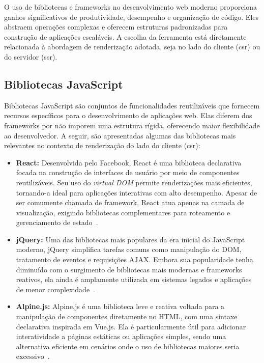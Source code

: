 O uso de bibliotecas e frameworks no desenvolvimento web moderno proporciona ganhos significativos de produtividade, desempenho e organização de código. Eles abstraem operações complexas e oferecem estruturas padronizadas para construção de aplicações escaláveis. A escolha da ferramenta está diretamente relacionada à abordagem de renderização adotada, seja no lado do cliente (\acrshort{csr}) ou do servidor (\acrshort{ssr}).

\subsection{Bibliotecas JavaScript}
\label{subsec:bibliotecas-js}

Bibliotecas JavaScript são conjuntos de funcionalidades reutilizáveis que fornecem recursos específicos para o desenvolvimento de aplicações web. Elas diferem dos frameworks por não imporem uma estrutura rígida, oferecendo maior flexibilidade ao desenvolvedor. A seguir, são apresentadas algumas das bibliotecas mais relevantes no contexto de renderização do lado do cliente (\acrshort{csr}):


\begin{itemize}
  \item \textbf{React:} Desenvolvida pelo Facebook, React é uma biblioteca declarativa focada na construção de interfaces de usuário por meio de componentes reutilizáveis. Seu uso do \textit{virtual DOM} permite renderizações mais eficientes, tornando-a ideal para aplicações interativas com alto desempenho. Apesar de ser comumente chamada de framework, React atua apenas na camada de visualização, exigindo bibliotecas complementares para roteamento e gerenciamento de estado~\cite{react2025}.

  \item \textbf{jQuery:} Uma das bibliotecas mais populares da era inicial do JavaScript moderno, jQuery simplifica tarefas comuns como manipulação do DOM, tratamento de eventos e requisições AJAX. Embora sua popularidade tenha diminuído com o surgimento de bibliotecas mais modernas e frameworks reativos, ela ainda é amplamente utilizada em sistemas legados e aplicações de menor complexidade~\cite{jquery2023}.

  \item \textbf{Alpine.js:} Alpine.js é uma biblioteca leve e reativa voltada para a manipulação de componentes diretamente no HTML, com uma sintaxe declarativa inspirada em Vue.js. Ela é particularmente útil para adicionar interatividade a páginas estáticas ou aplicações simples, sendo uma alternativa eficiente em cenários onde o uso de bibliotecas maiores seria excessivo~\cite{alpinejs2023}.
\end{itemize}

